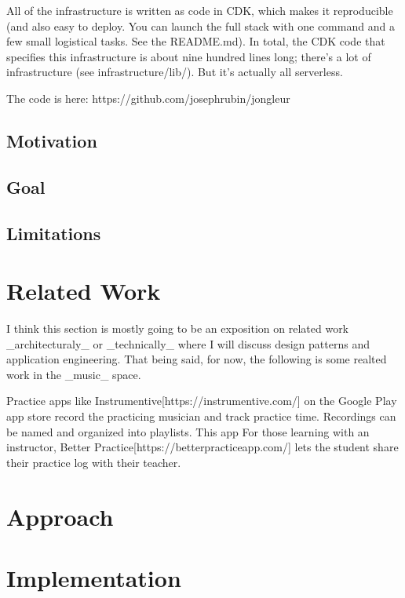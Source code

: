 \documentclass{article}
\begin{document}
All of the infrastructure is written as code in CDK, which makes it reproducible (and also easy to deploy. You can launch the full stack with one command and a few small logistical tasks. See the README.md).
In total, the CDK code that specifies this infrastructure is about nine hundred lines long; there's a lot of infrastructure (see infrastructure/lib/).
But it's actually all serverless.

The code is here: https://github.com/josephrubin/jongleur

\subsection{Motivation} 


\subsection{Goal}

\subsection{Limitations}


\section{Related Work}

I think this section is mostly going to be an exposition on related work \_architecturaly\_ or \_technically\_ where I will discuss design patterns and application engineering.
That being said, for now, the following is some realted work in the \_music\_ space.

Practice apps like Instrumentive[https://instrumentive.com/] on the Google Play app store record the practicing musician and track practice time.
Recordings can be named and organized into playlists.
This app 
For those learning with an instructor, Better Practice[https://betterpracticeapp.com/] lets the student share their practice log with their teacher.


\section{Approach} 
\section{Implementation}
\end{document}
